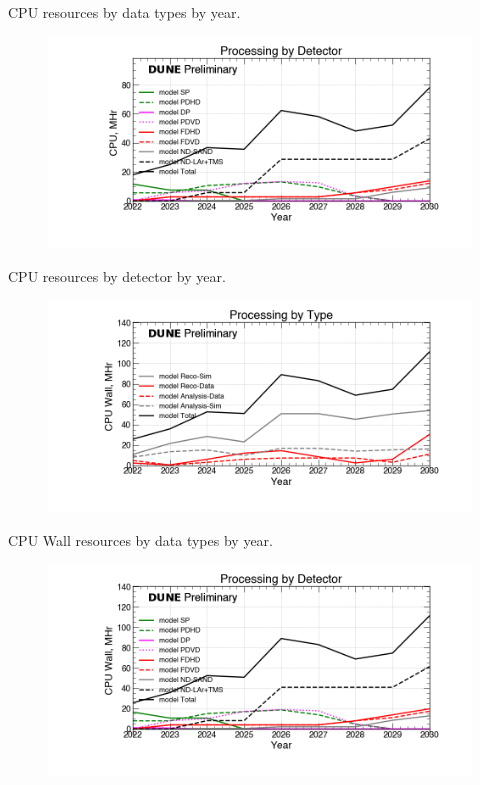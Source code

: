 \begin{table}[h]
\label{tab:CPU_Types}
\caption{CPU resources by data types by year.}
\end{table}
\pagebreak
\begin{figure}[ht]
\centering\includegraphics[height=0.4\textwidth]{Feb24_noMWC_Processing-by-Detector-CPU.png}\end{figure}
\begin{table}[h]
\label{tab:CPU_Detectors}
\caption{CPU resources by detector by year.}
\end{table}
\pagebreak
\begin{figure}[ht]
\centering\includegraphics[height=0.4\textwidth]{Feb24_noMWC_Processing-by-Type-CPU-Wall.png}\end{figure}
\begin{table}[h]
\label{tab:CPU Wall_Types}
\caption{CPU Wall resources by data types by year.}
\end{table}
\pagebreak
\begin{figure}[ht]
\centering\includegraphics[height=0.4\textwidth]{Feb24_noMWC_Processing-by-Detector-CPU-Wall.png}\end{figure}
